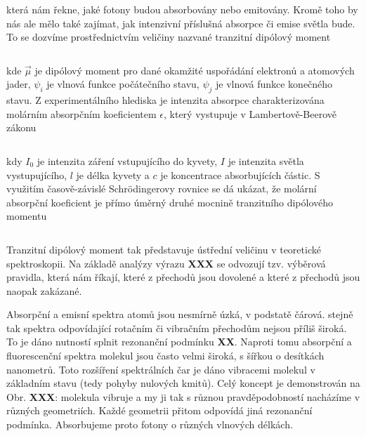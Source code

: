 \begin{equation}
\label{rov:XXX}
\end{equation}

\noindent která nám řekne, jaké fotony budou absorbovány nebo emitovány. Kromě toho by nás ale mělo také zajímat, jak intenzivní příslušná absorpce či emise světla bude. To se dozvíme prostřednictvím veličiny nazvané tranzitní dipólový moment


\begin{equation}
\label{rov:XXX}
\end{equation}


\noindent kde $\vec{\mu}$ je dipólový moment pro dané okamžité uspořádání elektronů a atomových jader, $\psi_i$ je vlnová funkce počátečního stavu, $\psi_j$ je vlnová funkce konečného stavu. Z experimentálního hlediska je intenzita absorpce charakterizována molárním absorpčním koeficientem $\epsilon$, který vystupuje v Lambertově-Beerově zákonu

\begin{equation}
\label{rov:XXX}
\end{equation}

\noindent kdy $I_0$ je intenzita záření vstupujícího do kyvety, $I$ je intenzita světla vystupujícího, $l$ je délka kyvety a $c$ je koncentrace absorbujících částic. S využitím časově-závislé Schr\"odingerovy rovnice se dá ukázat, že molární absorpční koeficient je přímo úměrný druhé mocnině tranzitního dipólového momentu

\begin{equation}
\label{rov:XXX}
\end{equation}

Tranzitní dipólový moment tak představuje ústřední veličinu v teoretické spektroskopii. Na základě analýzy výrazu \textbf{XXX} se odvozují tzv. výběrová pravidla, která nám říkají, které z přechodů jsou dovolené a které z přechodů jsou naopak zakázané.

Absorpční a emisní spektra atomů jsou nesmírně úzká, v podstatě čárová. stejně tak spektra odpovídající rotačním či vibračním přechodům nejsou příliš široká. To je dáno nutností splnit rezonanční podmínku \textbf{XX}. Naproti tomu absorpční a fluorescenční spektra molekul jsou často velmi široká, s šířkou o desítkách nanometrů. Toto rozšíření spektrálních čar je dáno vibracemi molekul v základním stavu (tedy pohyby nulových kmitů). Celý koncept je demonstrován na Obr. \textbf{XXX}: molekula vibruje  a my ji tak s různou pravděpodobností nacházíme v různých geometriích. Každé geometrii přitom odpovídá jiná rezonanční podmínka. Absorbujeme proto fotony o různých vlnových délkách.

